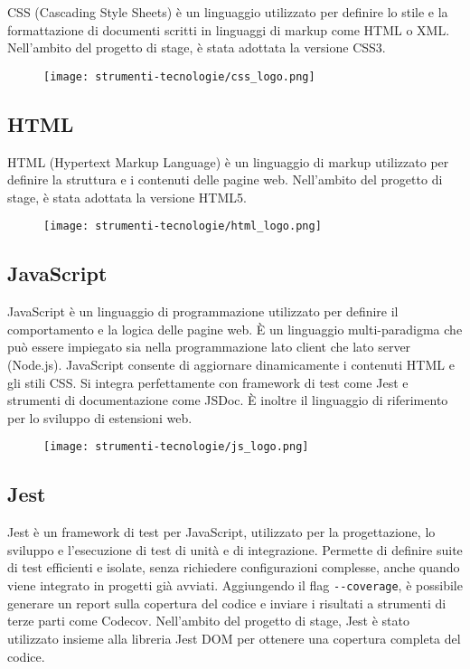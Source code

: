 \par CSS (Cascading Style Sheets) è un linguaggio utilizzato per definire lo stile e la formattazione di documenti scritti in linguaggi di markup come HTML o XML. Nell’ambito del progetto di stage, è stata adottata la versione CSS3.

\begin{figure}[H]
    \centering 
    \texttt{[image: strumenti-tecnologie/css\_logo.png]} 
\end{figure}

\subsection*{HTML}

\par HTML (Hypertext Markup Language) è un linguaggio di markup utilizzato per definire la struttura e i contenuti delle pagine web. Nell’ambito del progetto di stage, è stata adottata la versione HTML5.

\begin{figure}[H]
    \centering 
    \texttt{[image: strumenti-tecnologie/html\_logo.png]} 
\end{figure}

\subsection*{JavaScript}

\par JavaScript è un linguaggio di programmazione utilizzato per definire il comportamento e la logica delle pagine web. È un linguaggio multi-paradigma che può essere impiegato sia nella programmazione lato client che lato server (Node.js). JavaScript consente di aggiornare dinamicamente i contenuti HTML e gli stili CSS. Si integra perfettamente con \gls{framework} di test come Jest e strumenti di documentazione come JSDoc. È inoltre il linguaggio di riferimento per lo sviluppo di estensioni web.

\begin{figure}[H]
    \centering 
    \texttt{[image: strumenti-tecnologie/js\_logo.png]} 
\end{figure}

\subsection*{Jest}

\par Jest è un \gls{framework} di test per JavaScript, utilizzato per la progettazione, lo sviluppo e l’esecuzione di test di unità e di integrazione. Permette di definire suite di test efficienti e isolate, senza richiedere configurazioni complesse, anche quando viene integrato in progetti già avviati. Aggiungendo il flag \verb|--coverage|, è possibile generare un report sulla copertura del codice e inviare i risultati a strumenti di terze parti come Codecov. Nell’ambito del progetto di stage, Jest è stato utilizzato insieme alla libreria Jest DOM per ottenere una copertura completa del codice.

